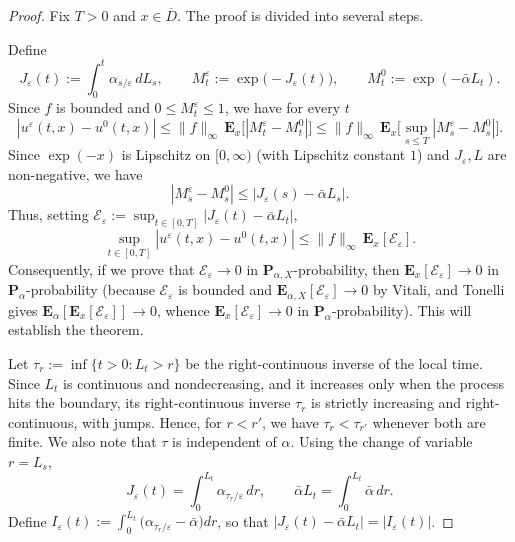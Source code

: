 \documentclass[10pt,a4paper]{amsart}
\begin{document}
\begin{proof}
	Fix $T>0$ and $x\in\overline D$. The proof is divided into several steps.
	
	Define 
	\[
	J_\varepsilon(t):=\int_0^t \alpha_{s/\varepsilon}\,dL_s,\qquad 
	M_t^\varepsilon:=\exp\bigl(-J_\varepsilon(t)\bigr),\qquad 
	M_t^0:=\exp(-\bar\alpha L_t).
	\]
	Since $f$ is bounded and $0\le M_t^\varepsilon \le1$, we have for every $t$
	\[
	|u^\varepsilon(t,x)-u^0(t,x)|\le \|f\|_\infty\,\mathbf E_x\bigl[|M_t^\varepsilon-M_t^0|\bigr]
	\le \|f\|_\infty\,\mathbf E_x\bigl[\sup_{s\le T}|M_s^\varepsilon-M_s^0|\bigr].
	\]
	Since \(\exp(-x)\) is Lipschitz on $[0,\infty)$ (with Lipschitz constant $1$) and \(J_\varepsilon, L\) are non-negative, we have
	\[
	|M_s^\varepsilon-M_s^0|\le |J_\varepsilon(s)-\bar\alpha L_s|.
	\]
	Thus, setting $\mathcal E_\varepsilon:=\sup_{t\in[0,T]}|J_\varepsilon(t)-\bar\alpha L_t|$,
	\[
	\sup_{t\in[0,T]}|u^\varepsilon(t,x)-u^0(t,x)|\le \|f\|_\infty\,\mathbf E_x[\mathcal E_\varepsilon].
	\]
	Consequently, if we prove that $\mathcal E_\varepsilon\to0$ in $\mathbf P_{\alpha,X}$-probability,
	then $\mathbf E_x[\mathcal E_\varepsilon]\to0$ in $\mathbf P_\alpha$-probability (because $\mathcal E_\varepsilon$ is bounded and $\mathbf E_{\alpha,X}[\mathcal E_\varepsilon]\to0$ by Vitali, and Tonelli gives $\mathbf E_\alpha[\mathbf E_x[\mathcal E_\varepsilon]]\to0$, whence $\mathbf E_x[\mathcal E_\varepsilon]\to0$ in $\mathbf P_\alpha$-probability). This will establish the theorem.
	
		Let $\tau_r:=\inf\{t>0:L_t>r\}$ be the right-continuous inverse of the local time.
	Since $L_t$ is continuous and nondecreasing, and it increases only when the process hits the boundary, its right-continuous inverse $\tau_r$ is strictly increasing and right-continuous, with jumps. 
	Hence, for $r<r'$, we have $\tau_r<\tau_{r'}$ whenever both are finite. We also note that \(\tau\) is independent of $\alpha$.
	Using the change of variable $r=L_s$,
	\[
	J_\varepsilon(t)=\int_0^{L_t}\alpha_{\tau_r/\varepsilon}\,dr,\qquad 
	\bar\alpha L_t = \int_0^{L_t}\bar\alpha\,dr.
	\]
	Define $I_\varepsilon(t):=\int_0^{L_t}\bigl(\alpha_{\tau_r/\varepsilon}-\bar\alpha\bigr)dr$,
	so that $|J_\varepsilon(t)-\bar\alpha L_t|=|I_\varepsilon(t)|$.
	

\end{proof}
\end{document}
